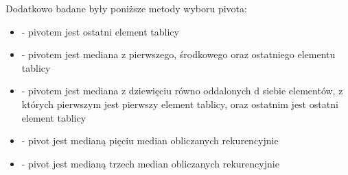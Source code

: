 Dodatkowo badane były poniższe metody wyboru pivota:
\begin{itemize}
	\setlength\itemsep{0em}
	\item {} - pivotem jest ostatni element tablicy
	\item {} - pivotem jest mediana z pierwszego, środkowego oraz ostatniego elementu tablicy
	\item {} - pivotem jest mediana z dziewięciu równo oddalonych d siebie elementów, z których pierwszym jest pierwszy element tablicy, oraz ostatnim jest ostatni element tablicy
	\item {} - pivot jest medianą pięciu median obliczanych rekurencyjnie
	\item {} - pivot jest medianą trzech median obliczanych rekurencyjnie\\
	
\end{itemize}







\begin{figure}[H]
	\centering
	
	\caption[]{}
	\label{fig:quick-sort-deterministic-pivot-random}
\end{figure}

\begin{figure}[H]
	\centering
	
	\caption[]{}
	\label{fig:quick-sort-deterministic-pivot-reversed}
\end{figure}

